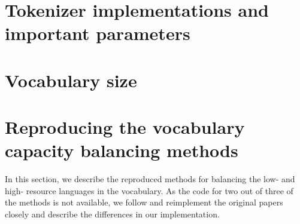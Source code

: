 
\section{Tokenizer implementations and important parameters}


\section{Vocabulary size}


\section{Reproducing the vocabulary capacity balancing methods}



In this section, we describe the reproduced methods for balancing the low- and high- resource languages in the vocabulary. As the code for two out of three of the methods is not available, we follow and reimplement the original papers closely and describe the differences in our implementation.

